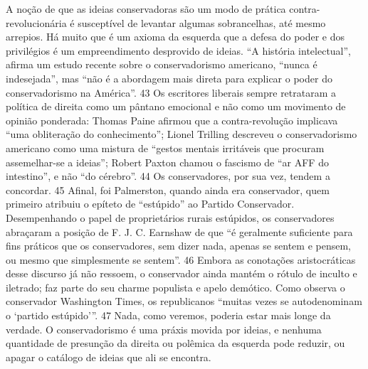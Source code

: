 A noção de que as ideias conservadoras são um modo de prática contra-revolucionária é susceptível de levantar algumas sobrancelhas, até mesmo arrepios. Há muito que é um axioma da esquerda que a defesa do poder e dos privilégios é um empreendimento desprovido de ideias. “A história intelectual”, afirma um estudo recente sobre o conservadorismo americano, “nunca é indesejada”, mas “não é a abordagem mais direta para explicar o poder do conservadorismo na América”.
 {\color{blue} 43}  
Os escritores liberais sempre retrataram a política de direita como um pântano emocional e não como um movimento de opinião ponderada: Thomas Paine afirmou que a contra-revolução implicava “uma obliteração do conhecimento”; Lionel Trilling descreveu o conservadorismo americano como uma mistura de “gestos mentais irritáveis ​​que procuram assemelhar-se a ideias”; Robert Paxton chamou o fascismo de “ar AFF do intestino”, e não “do cérebro”.
 {\color{blue} 44}  
Os conservadores, por sua vez, tendem a concordar.
 {\color{blue} 45}  
Afinal, foi Palmerston, quando ainda era conservador, quem primeiro atribuiu o epíteto de “estúpido” ao Partido Conservador. Desempenhando o papel de proprietários rurais estúpidos, os conservadores abraçaram a posição de F. J. C. Earnshaw de que “é geralmente suficiente para fins práticos que os conservadores, sem dizer nada, apenas se sentem e pensem, ou mesmo que simplesmente se sentem”.
 {\color{blue} 46}  
Embora as conotações aristocráticas desse discurso já não ressoem, o conservador ainda mantém o rótulo de inculto e iletrado; faz parte do seu charme populista e apelo demótico. Como observa o conservador Washington Times, os republicanos “muitas vezes se autodenominam o ‘partido estúpido’”.
 {\color{blue} 47}  
Nada, como veremos, poderia estar mais longe da verdade. O conservadorismo é uma práxis movida por ideias, e nenhuma quantidade de presunção da direita ou polêmica da esquerda pode reduzir, ou apagar o catálogo de ideias que ali se encontra.
 
\par
 
